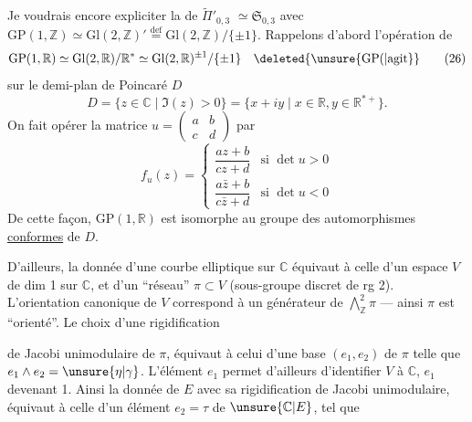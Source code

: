 
Je voudrais encore expliciter la  de
$\widetilde{\Pi}'_{0,3}$ 
$\simeq\mathfrak S_{0,3}$ 
avec $\mathrm{GP}(1,\mathbb Z)\simeq\mathrm{Gl}(2,\mathbb Z)'\overset{\mathrm{def}}{=}\mathrm{Gl}(2,\mathbb Z)/\{\pm1\}$.
Rappelons d'abord l'opération de
\[
\mathrm{GP}(1,\mathbb R)\simeq\mathrm{Gl}(2,\mathbb R)/\mathbb R^*
\simeq\mathrm{Gl}(2,\mathbb R)^{\pm1}/\{\pm1\}\quad\deleted{\unsure{\mathrm{GP}(|\text{agit}}}
\tag{26}
\]
sur le demi-plan de Poincaré $D$
\[
D=\{z\in\mathbb C\mid\Im(z)>0\}=\{x+iy\mid x\in\mathbb R,y\in\mathbb R^{*+}\}.
\tag{27}
\]
On fait opérer la matrice $u=\begin{pmatrix}a&b\\c&d\end{pmatrix}$ par
\[
f_u(z)=\left\{\begin{array}{ll}
\dfrac{az+b}{cz+d}&\text{si }\det u>0\\[4pt]
\dfrac{a\bar z+b}{c\bar z+d}&\text{si }\det u<0
\end{array}\right.
\tag{28}
\]
De cette façon, $\mathrm{GP}(1,\mathbb R)$ est isomorphe au groupe des automorphismes \uline{conformes} de $D$.


D'ailleurs, la donnée d'une courbe elliptique  sur $\mathbb C$ équivaut à celle d'un espace $V$ de dim 1 sur $\mathbb C$, et d'un ``réseau'' $\pi\subset V$ (sous-groupe discret de rg 2).
L'orientation canonique de $V$ correspond à un générateur \unsure{$\eta|\gamma$} de $\bigwedge^2_{\mathbb Z}\pi$ --- ainsi $\pi$ est ``orienté''. Le choix d'une rigidification


de Jacobi unimodulaire de $\pi$, équivaut à celui d'une base $(e_1,e_2)$ de $\pi$  telle que $e_1\wedge e_2=\unsure{\eta|\gamma}$. L'élément $e_1$  permet d'ailleurs d'identifier $V$ à $\mathbb C$, $e_1$ devenant 1. Ainsi la donnée de $E$ avec sa rigidification de Jacobi unimodulaire, équivaut à celle d'un élément $e_2=\tau$ de $\unsure{\mathbb C|E}$, tel que

